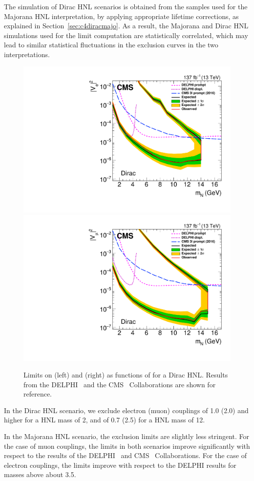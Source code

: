 The simulation of Dirac HNL scenarios is obtained from
the samples used for the Majorana HNL interpretation, by
applying appropriate lifetime corrections, as explained in Section~\ref{sec:c4diracmajo}.
As a result, the Majorana and Dirac HNL simulations used for the limit
computation are statistically correlated, which may lead to
similar statistical fluctuations in the exclusion curves in the two
interpretations.\\

\begin{figure}[h!]
    \centering
    \includegraphics[width=.49\textwidth]{Figures/paper/dirac_ele.pdf}
    \hfill
    \includegraphics[width=.49\textwidth]{Figures/paper/dirac_muo.pdf}
    \caption{\label{fig:limits_Dir}
        Limits on \mixpare (left) and \mixparm (right) as
        functions of \mhnl for a Dirac HNL. Results from the DELPHI~\cite{Abreu:1996pa}
        and the CMS~\cite{Sirunyan:2018mtv} Collaborations are shown
        for reference. 
    }
\end{figure}
\vspace{5cm}
In the Dirac HNL scenario, we exclude electron (muon) couplings of
1.0 (2.0) and higher for a HNL mass of
2\GeV, and of 0.7 (2.5) for a HNL mass of
12\GeV.

In the Majorana HNL scenario, the exclusion limits are slightly less stringent.
For the case of muon couplings, the limits in both scenarios improve
significantly with respect to the results of the
DELPHI~\cite{Abreu:1996pa} and
CMS~\cite{Sirunyan:2018mtv} Collaborations.
For the case of electron couplings, the limits improve with
respect to the DELPHI results for masses above about 3.5\GeV.

